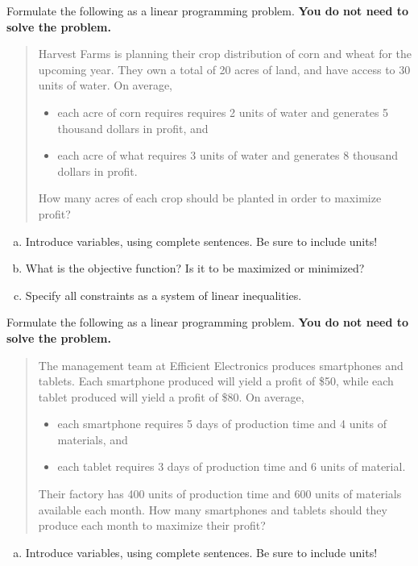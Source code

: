 \documentclass[12pt,legalpaper]{exam}
\begin{document}
\begin{questions}


\question[5] Formulate the following as a linear programming problem.  \textbf{You do not need to solve the problem.}
\begin{quote}
Harvest Farms is planning their crop distribution of corn and wheat for the upcoming year.  They own a total of 20 acres of land, and have access to 30 units of water.  On average,
\begin{itemize}
\item each acre of corn requires requires 2 units of water and generates 5 thousand dollars in profit, and
\item each acre of what requires 3 units of water and generates 8 thousand dollars in profit.
\end{itemize}
How many acres of each crop should be planted in order to maximize profit?
\end{quote}
\begin{enumerate}[(a)]
\item Introduce variables, using complete sentences.  Be sure to include units!
\vspace{4cm}

\item What is the objective function?  Is it to be maximized or minimized?
\vspace{4cm}

\item Specify all constraints as a system of linear inequalities.
\newpage
\end{enumerate}

\question[5] Formulate the following as a linear programming problem.  \textbf{You do not need to solve the problem.}
\begin{quote}
The management team at Efficient Electronics produces smartphones and tablets.  Each smartphone produced will yield a profit of \$50, while each tablet produced will yield a profit of \$80.  On average,
\begin{itemize}
\item each smartphone requires 5 days of production time and 4 units of materials, and
\item each tablet requires 3 days of production time and 6 units of material.
\end{itemize}
Their factory has 400 units of production time and 600 units of materials available each month.  How many smartphones and tablets should they produce each month to maximize their profit?
\end{quote}
\begin{enumerate}[(a)]
\item Introduce variables, using complete sentences.  Be sure to include units!
\vspace{4cm}


\end{enumerate}
\end{questions}
\end{document}
